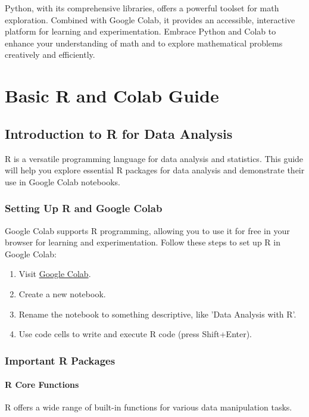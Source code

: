 \documentclass[a4paper,12pt]{book}
\newcounter{problem}
\begin{document}
Python, with its comprehensive libraries, offers a powerful toolset for math exploration. Combined with Google Colab, it provides an accessible, interactive platform for learning and experimentation. Embrace Python and Colab to enhance your understanding of math and to explore mathematical problems creatively and efficiently.


\chapter{Basic R and Colab Guide}
\section*{Introduction to R for Data Analysis}

R is a versatile programming language for data analysis and statistics. This guide will help you explore essential R packages for data analysis and demonstrate their use in Google Colab notebooks.

\subsection*{Setting Up R and Google Colab}

Google Colab supports R programming, allowing you to use it for free in your browser for learning and experimentation. Follow these steps to set up R in Google Colab:

\begin{enumerate}
    \item Visit \href{https://colab.research.google.com/}{Google Colab}.
    \item Create a new notebook.
    \item Rename the notebook to something descriptive, like 'Data Analysis with R'.
    \item Use code cells to write and execute R code (press Shift+Enter).
\end{enumerate}

\subsection*{Important R Packages}

\subsubsection*{R Core Functions}
R offers a wide range of built-in functions for various data manipulation tasks.
\end{document}
